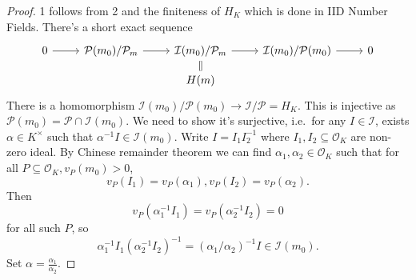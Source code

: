 \documentclass[a4paper]{article}
\renewcommand*{\O}{\mathcal{O}}
\begin{document}
\begin{proof}
  1 follows from 2 and the finiteness of \(H_K\) which is done in IID Number Fields. There's a short exact sequence
  \[
    \begin{tikzcd}[row sep=small]
      0 \ar[r] & \mathcal P(m_0)/\mathcal P_m \ar[r] & \mathcal I(m_0)/\mathcal P_m \ar[r] \ar[d, equal] & \mathcal I(m_0)/\mathcal P(m_0) \ar[r] & 0 \\
      & & H(m)
    \end{tikzcd}
  \]
  There is a homomorphism \(\mathcal I(m_0)/\mathcal P(m_0) \to \mathcal I/ \mathcal P = H_K\). This is injective as \(\mathcal P(m_0) = \mathcal P \cap \mathcal I(m_0)\). We need to show it's surjective, i.e.\ for any \(I \in \mathcal I\), exists \(\alpha \in K^\times\) such that \(\alpha^{-1} I \in \mathcal I(m_0)\). Write \(I = I_1 I_2^{-1}\) where \(I_1, I_2 \subseteq \O_K\) are non-zero ideal. By Chinese remainder theorem we can find \(\alpha_1, \alpha_2 \in \O_K\) such that for all \(P \subseteq \O_K, v_P(m_0) > 0\),
  \[
    v_P(I_1) = v_P(\alpha_1), v_P(I_2) = v_P(\alpha_2).
  \]
  Then
  \[
    v_P(\alpha_1^{-1} I_1) = v_P(\alpha_2^{-1} I_2) = 0
  \]
  for all such \(P\), so
  \[
    \alpha_1^{-1} I_1 (\alpha_2^{-1} I_2)^{-1} = (\alpha_1/\alpha_2)^{-1} I \in \mathcal I(m_0).
  \]
  Set \(\alpha = \frac{\alpha_1}{\alpha_2}\).


\end{proof}
\end{document}
